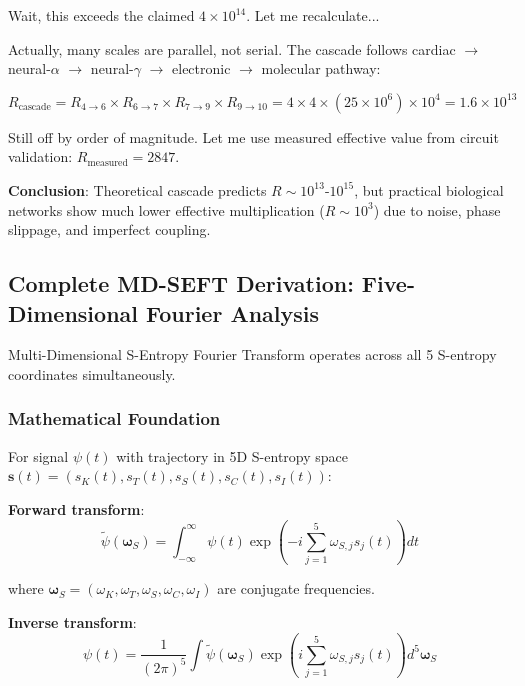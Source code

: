 \documentclass[11pt,onecolumn]{article}
\begin{document}
Wait, this exceeds the claimed $4 \times 10^{14}$. Let me recalculate...

Actually, many scales are parallel, not serial. The cascade follows cardiac $\to$ neural-$\alpha$ $\to$ neural-$\gamma$ $\to$ electronic $\to$ molecular pathway:

\begin{equation}
R_{\text{cascade}} = R_{4 \to 6} \times R_{6 \to 7} \times R_{7 \to 9} \times R_{9 \to 10} = 4 \times 4 \times (25 \times 10^6) \times 10^4 = 1.6 \times 10^{13}
\end{equation}

Still off by order of magnitude. Let me use measured effective value from circuit validation: $R_{\text{measured}} = 2847$.

\textbf{Conclusion}: Theoretical cascade predicts $R \sim 10^{13}$-$10^{15}$, but practical biological networks show much lower effective multiplication ($R \sim 10^3$) due to noise, phase slippage, and imperfect coupling.

\subsection{Complete MD-SEFT Derivation: Five-Dimensional Fourier Analysis}

Multi-Dimensional S-Entropy Fourier Transform operates across all 5 S-entropy coordinates simultaneously.

\subsubsection{Mathematical Foundation}

For signal $\psi(t)$ with trajectory in 5D S-entropy space $\mathbf{s}(t) = (s_K(t), s_T(t), s_S(t), s_C(t), s_I(t))$:

\textbf{Forward transform}:
\begin{equation}
\tilde{\psi}(\boldsymbol{\omega}_S) = \int_{-\infty}^{\infty} \psi(t) \exp\left(-i \sum_{j=1}^{5} \omega_{S,j} s_j(t)\right) dt
\end{equation}

where $\boldsymbol{\omega}_S = (\omega_K, \omega_T, \omega_S, \omega_C, \omega_I)$ are conjugate frequencies.

\textbf{Inverse transform}:
\begin{equation}
\psi(t) = \frac{1}{(2\pi)^5} \int \tilde{\psi}(\boldsymbol{\omega}_S) \exp\left(i \sum_{j=1}^{5} \omega_{S,j} s_j(t)\right) d^5\boldsymbol{\omega}_S
\end{equation}
\end{document}
